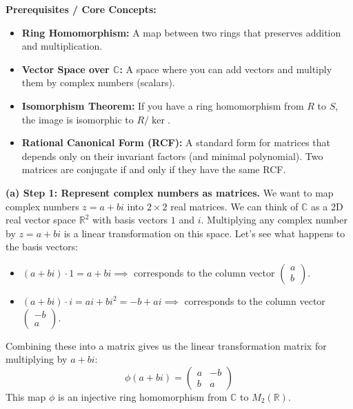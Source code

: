 \begin{solution}
\textbf{Prerequisites / Core Concepts:}
\begin{itemize}
    \item \textbf{Ring Homomorphism:} A map between two rings that preserves addition and multiplication.
    \item \textbf{Vector Space over $\mathbb{C}$:} A space where you can add vectors and multiply them by complex numbers (scalars).
    \item \textbf{Isomorphism Theorem:} If you have a ring homomorphism from $R$ to $S$, the image is isomorphic to $R / \ker$.
    \item \textbf{Rational Canonical Form (RCF):} A standard form for matrices that depends only on their invariant factors (and minimal polynomial). Two matrices are conjugate if and only if they have the same RCF.
\end{itemize}

\textbf{(a) Step 1: Represent complex numbers as matrices.}
We want to map complex numbers $z = a + bi$ into $2 \times 2$ real matrices. We can think of $\mathbb{C}$ as a 2D real vector space $\mathbb{R}^2$ with basis vectors $1$ and $i$. 
Multiplying any complex number by $z = a + bi$ is a linear transformation on this space. Let's see what happens to the basis vectors:
\begin{itemize}
    \item $(a+bi) \cdot 1 = a + bi \implies$ corresponds to the column vector $\begin{pmatrix} a \\ b \end{pmatrix}$.
    \item $(a+bi) \cdot i = ai + bi^2 = -b + ai \implies$ corresponds to the column vector $\begin{pmatrix} -b \\ a \end{pmatrix}$.
\end{itemize}
Combining these into a matrix gives us the linear transformation matrix for multiplying by $a+bi$:
\[ \phi(a + bi) = \begin{pmatrix} a & -b \\ b & a \end{pmatrix} \]
This map $\phi$ is an injective ring homomorphism from $\mathbb{C}$ to $M_2(\mathbb{R})$.


\end{solution}
